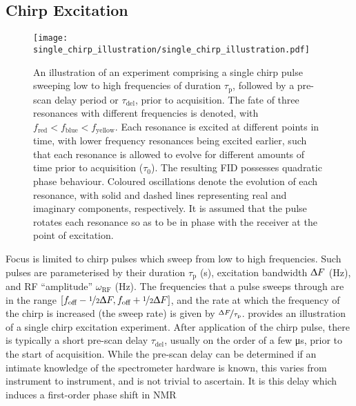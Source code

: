 \subsection{Chirp Excitation}
\begin{figure}
    \centering
    \texttt{[image: single\_chirp\_illustration/single\_chirp\_illustration.pdf]}
    \caption[
        An illustration of an experiment comprising a single chirp pulse.
    ]
    {
        An illustration of an experiment comprising a single chirp pulse sweeping
        low to high frequencies of duration $\tau_{\text{p}}$, followed by
        a pre-scan delay period or $\tau_{\text{del}}$, prior to
        acquisition. The fate of three resonances with different frequencies is
        denoted, with $f_{\text{red}} < f_{\text{blue}} <
        f_{\text{yellow}}$. Each resonance is excited at different points
        in time, with lower frequency resonances being excited earlier, such that
        each resonance is allowed to evolve for different amounts of time prior
        to acquisition ($\tau_0$).
        The resulting \ac{FID} possesses quadratic phase behaviour.
        Coloured oscillations denote the evolution of each resonance, with
        solid and dashed lines representing real and imaginary components,
        respectively. It is assumed that the pulse rotates each
        resonance so as to be in phase with the receiver at the point of
        excitation.
    }
    \label{fig:single-chirp}
\end{figure}
Focus is limited to chirp pulses which sweep from low to high
frequencies. Such pulses are parameterised by
their duration $\tau_{\text{p}}$ (\unit{\second}),
excitation bandwidth $\Updelta F$ (\unit{\hertz}),
and \ac{RF} ``amplitude'' $\omega_{\text{RF}}$ (\unit{\hertz}).
The frequencies that a pulse sweeps through are in the range
$[f_{\text{off}} - \nicefrac{1}{2} \Updelta F,
f_{\text{off}} + \nicefrac{1}{2} \Updelta F]$,
and the rate at which the frequency of the chirp is increased (the sweep
rate) is given by $\nicefrac{\Updelta F}{\tau_{\text{p}}}$.
 provides an illustration of a single chirp
excitation experiment. After application of the chirp pulse, there is typically
a short pre-scan delay $\tau_{\text{del}}$, usually on the order of a few
\unit{\micro\second}, prior to the start of acquisition. While the pre-scan
delay can be determined if an intimate knowledge of the spectrometer hardware
is known, this varies from instrument to instrument, and is not trivial to
ascertain. It is this delay which induces a first-order phase shift in \ac{NMR}
